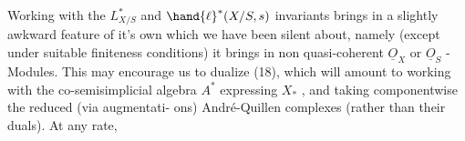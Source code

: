 Working with the $L^{*}_{X/S}$  and $\hand{\ell}^{*}(X/S,s)$  invariants brings in a
slightly awkward feature of it's own which we have been silent about,
namely (except under suitable finiteness conditions) it brings in non
quasi-coherent $\underline{O}_{X}$ or $\underline{O}_{S}$ - Modules.  This may encourage us to dualize
(18),  which will amount to working with the co-semisimplicial algebra
$A^{*}$ expressing $X_{*}$ ,  and taking componentwise the reduced (via augmentati-%
ons)  André-Quillen complexes (rather than their duals).  At any rate,



